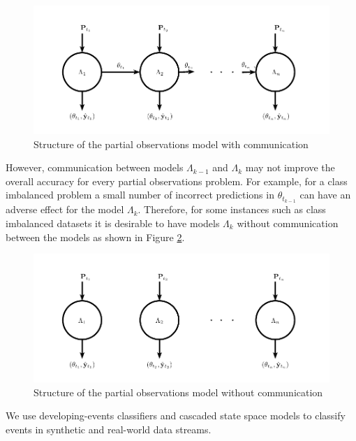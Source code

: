 \documentclass[11pt]{article}
\begin{document}
	\begin{figure}[H]
	\centering
	\includegraphics[clip=true,scale=0.8]{./Graphics/Lots_of_circles_3.pdf}
	\caption{\footnotesize Structure of the partial observations model with communication}
	\label{fig:PODLM}
	\end{figure}
	 
	 
	However, communication between models $\Lambda_{k-1}$ and $\Lambda_k$ may not improve the overall accuracy for every partial observations problem. For example, for a class imbalanced problem a small number of incorrect predictions in $\theta_{t_{k-1}}$ can have an adverse effect for the model $\Lambda_k$. Therefore, for some instances such as class imbalanced datasets it is desirable to have  models $\Lambda_k$ without communication between the models as shown in Figure \ref{fig:PODLM2}.  
	
	
	\begin{figure}[H]
	\centering
	\includegraphics[clip=true,scale=0.8]{./Graphics/Lots_of_circles_4.pdf}
	\caption{\footnotesize Structure of the partial observations model without communication}
	\label{fig:PODLM2}
	\end{figure}
	
	We use developing-events classifiers and  cascaded state space models to classify events in synthetic and real-world data streams. 

\end{document}
